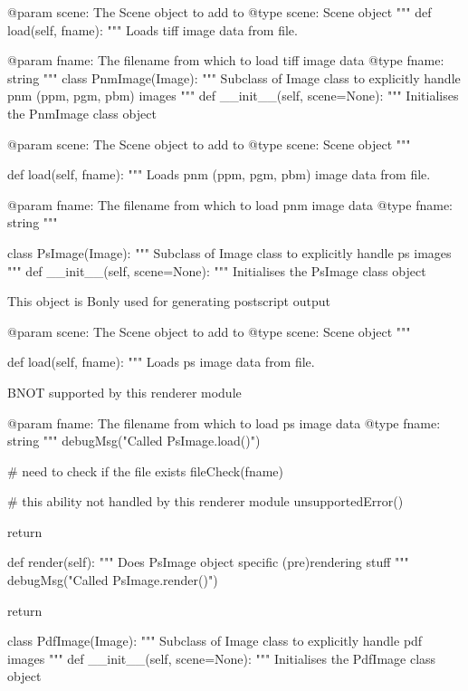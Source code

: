 \begin{python}
\begin{python}
\begin{verbose}
        @param scene: The Scene object to add to
        @type scene: Scene object
        """
    def load(self, fname):
        """
        Loads tiff image data from file.

        @param fname: The filename from which to load tiff image data
        @type fname: string
        """
class PnmImage(Image):
    """
    Subclass of Image class to explicitly handle pnm (ppm, pgm, pbm) images
    """
    def __init__(self, scene=None):
        """
        Initialises the PnmImage class object

        @param scene: The Scene object to add to
        @type scene: Scene object
        """
        
    def load(self, fname):
        """
        Loads pnm (ppm, pgm, pbm) image data from file.

        @param fname: The filename from which to load pnm image data
        @type fname: string
        """

class PsImage(Image):
    """
    Subclass of Image class to explicitly handle ps images
    """
    def __init__(self, scene=None):
        """
        Initialises the PsImage class object

        This object is B{only} used for generating postscript output

        @param scene: The Scene object to add to
        @type scene: Scene object
        """

    def load(self, fname):
        """
        Loads ps image data from file.

        B{NOT} supported by this renderer module

        @param fname: The filename from which to load ps image data
        @type fname: string
        """
        debugMsg("Called PsImage.load()")

        # need to check if the file exists
        fileCheck(fname)

        # this ability not handled by this renderer module
        unsupportedError()
        
        return

    def render(self):
        """
        Does PsImage object specific (pre)rendering stuff
        """
        debugMsg("Called PsImage.render()")

        return

class PdfImage(Image):
    """
    Subclass of Image class to explicitly handle pdf images
    """
    def __init__(self, scene=None):
        """
        Initialises the PdfImage class object


\end{verbose}
\end{python}
\end{python}
